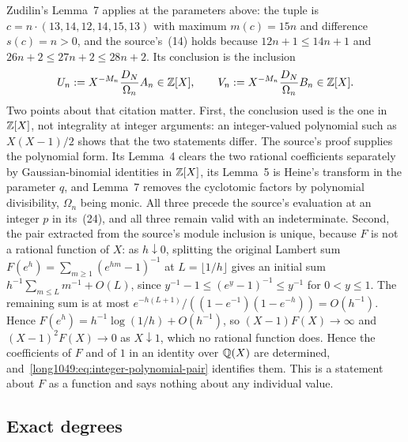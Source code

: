 \documentclass[11pt]{article}
\begin{document}
Zudilin's Lemma~7 \cite[p.~161, (23)]{zudilin2004} applies at the parameters above: the tuple is
$c=n\cdot(13,14,12,14,15,13)$ with maximum $m(c)=15n$ and difference $s(c)=n>0$,
and the source's~(14) holds because $12n+1\le14n+1$ and
$26n+2\le27n+2\le28n+2$.  Its conclusion is the inclusion
\begin{equation}\label{long1049:eq:integer-polynomial-pair}
 U_n:=X^{-M_n}\frac{D_N}{\Omega_n}A_n\in\mathbb{Z}[X],\qquad
 V_n:=X^{-M_n}\frac{D_N}{\Omega_n}B_n\in\mathbb{Z}[X].
\end{equation}
Two points about that citation matter.  First, the conclusion used is the one
in $\mathbb{Z}[X]$, not integrality at integer arguments: an integer-valued polynomial
such as $X(X-1)/2$ shows that the two statements differ.  The source's proof
supplies the polynomial form.  Its Lemma~4 clears the two rational coefficients
separately by Gaussian-binomial identities in $\mathbb{Z}[X]$, its Lemma~5 is Heine's
transform in the parameter $q$, and Lemma~7 removes the cyclotomic factors by
polynomial divisibility, $\Omega_n$ being monic.  All three precede the source's
evaluation at an integer $p$ in its~(24), and all three remain valid with an
indeterminate.  Second, the pair extracted from the source's module inclusion is
unique, because $F$ is not a rational function of $X$: as $h\downarrow0$,
splitting the original Lambert sum $F(e^h)=\sum_{m\ge1}(e^{hm}-1)^{-1}$
at $L=\lfloor1/h\rfloor$ gives an initial sum
$h^{-1}\sum_{m\le L}m^{-1}+O(L)$, since
$y^{-1}-1\le(e^y-1)^{-1}\le y^{-1}$ for $0<y\le1$.
The remaining sum is at most
$e^{-h(L+1)}/((1-e^{-1})(1-e^{-h}))=O(h^{-1})$.  Hence
$F(e^h)=h^{-1}\log(1/h)+O(h^{-1})$, so
$(X-1)F(X)\to\infty$ and $(X-1)^{2}F(X)\to0$ as $X\downarrow1$, which no
rational function does.  Hence the coefficients of $F$ and of $1$ in an identity
over $\mathbb{Q}(X)$ are determined, and~\eqref{long1049:eq:integer-polynomial-pair} identifies
them.  This is a statement about $F$ as a function and says nothing about any
individual value.

\subsection{Exact degrees}\label{long1049:sec:degrees}
\end{document}

